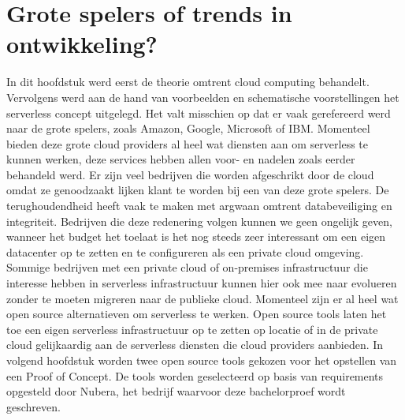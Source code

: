 \section{Grote spelers of trends in ontwikkeling?}
In dit hoofdstuk werd eerst de theorie omtrent cloud computing behandelt. Vervolgens werd aan de hand van voorbeelden en schematische voorstellingen het serverless concept uitgelegd. Het valt misschien op dat er vaak gerefereerd werd naar de grote spelers, zoals Amazon, Google, Microsoft of IBM. Momenteel bieden deze grote cloud providers al heel wat diensten aan om serverless te kunnen werken, deze services hebben allen voor- en nadelen zoals eerder behandeld werd. Er zijn veel bedrijven die worden afgeschrikt door de cloud omdat ze genoodzaakt lijken klant te worden bij een van deze grote spelers. De terughoudendheid heeft vaak te maken met argwaan omtrent databeveiliging en integriteit. Bedrijven die deze redenering volgen kunnen we geen ongelijk geven, wanneer het budget het toelaat is het nog steeds zeer interessant om een eigen datacenter op te zetten en te configureren als een private cloud omgeving. Sommige bedrijven met een private cloud of on-premises infrastructuur die interesse hebben in serverless infrastructuur kunnen hier ook mee naar evolueren zonder te moeten migreren naar de publieke cloud. Momenteel zijn er al heel wat open source alternatieven om serverless te werken. Open source tools laten het toe een eigen serverless infrastructuur op te zetten op locatie of in de private cloud gelijkaardig aan de serverless diensten die cloud providers aanbieden. In volgend hoofdstuk worden twee open source tools gekozen voor het opstellen van een Proof of Concept. De tools worden geselecteerd op basis van requirements opgesteld door Nubera, het bedrijf waarvoor deze bachelorproef wordt geschreven.

